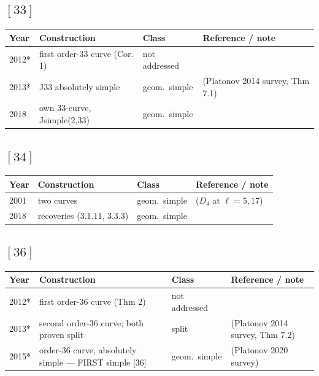 \documentclass[10pt]{amsart}
\begin{document}
\subsection*{$[33]$}
\begin{longtable}{p{0.9cm} p{7.6cm} p{2.3cm} p{4.2cm}}
\hline Year & Construction & Class & Reference / note \\ \hline
2012* & first order-33 curve (Cor. 1) & not addressed & \cite{PP2012b}\\
2013* & J33 absolutely simple & geom.\ simple & \cite{PZP2013} (Platonov 2014 survey, Thm 7.1)\\
2018 & own 33-curve, Jsimple(2,33) & geom.\ simple & \cite{Nicholls2018}\\
\hline\end{longtable}
\subsection*{$[34]$}
\begin{longtable}{p{0.9cm} p{7.6cm} p{2.3cm} p{4.2cm}}
\hline Year & Construction & Class & Reference / note \\ \hline
2001 & two curves & geom.\ simple & \cite{Elkies2002} ($D_4$ at $\ell{=}5,17$)\\
2018 & recoveries (3.1.11, 3.3.3) & geom.\ simple & \cite{Nicholls2018}\\
\hline\end{longtable}
\subsection*{$[36]$}
\begin{longtable}{p{0.9cm} p{7.6cm} p{2.3cm} p{4.2cm}}
\hline Year & Construction & Class & Reference / note \\ \hline
2012* & first order-36 curve (Thm 2) & not addressed & \cite{PP2012b}\\
2013* & second order-36 curve; both proven split & split & \cite{PZP2013} (Platonov 2014 survey, Thm 7.2)\\
2015* & order-36 curve, absolutely simple — FIRST simple [36] & geom.\ simple & \cite{PP2015} (Platonov 2020 survey)\\
\hline\end{longtable}
\end{document}
